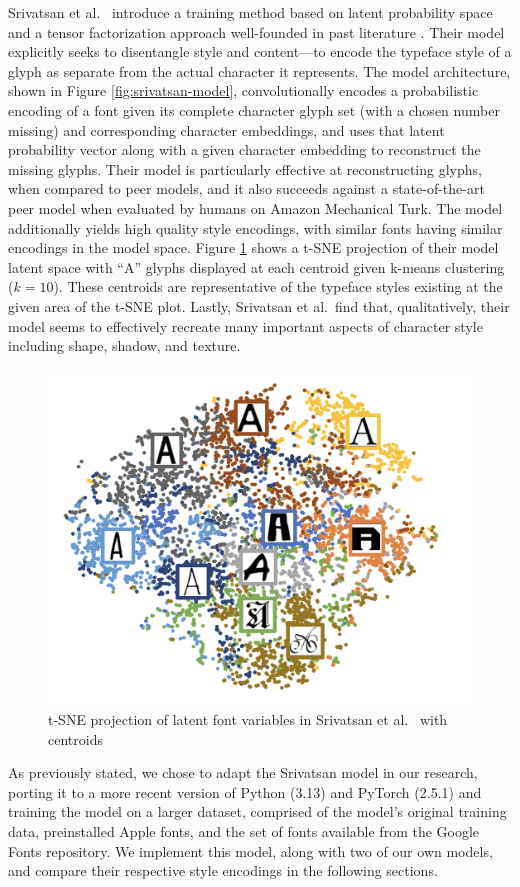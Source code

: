 Srivatsan et al.\ \cite{srivatsan2020} introduce a training method based on latent probability space and a tensor factorization approach well-founded in past literature \cite{freeman1997,tenenbaum2000,vasilescu2002,tang2013}. Their model explicitly seeks to disentangle style and content—to encode the typeface style of a glyph as separate from the actual character it represents. The model architecture, shown in Figure \ref{fig:srivatsan-model}, convolutionally encodes a probabilistic encoding of a font given its complete character glyph set (with a chosen number missing) and corresponding character embeddings, and uses that latent probability vector along with a given character embedding to reconstruct the missing glyphs. Their model is particularly effective at reconstructing glyphs, when compared to peer models, and it also succeeds against a state-of-the-art peer model \cite{azadi2017} when evaluated by humans on Amazon Mechanical Turk. The model additionally yields high quality style encodings, with similar fonts having similar encodings in the model space. Figure \ref{fig:srivatsan-latent} shows a t-SNE projection \cite{vandermaaten2008} of their model latent space with ``A'' glyphs displayed at each centroid given k-means clustering ($k=10$). These centroids are representative of the typeface styles existing at the given area of the t-SNE plot. Lastly, Srivatsan et al.\ find that, qualitatively, their model seems to effectively recreate many important aspects of character style including shape, shadow, and texture.

\begin{figure}[]
    \centering
    \includegraphics[width=.7\textwidth]{images/srivatsan-latent.png}
    \caption{t-SNE projection of latent font variables in Srivatsan et al.\ \cite{srivatsan2020} with centroids}
    \label{fig:srivatsan-latent}
\end{figure}

As previously stated, we chose to adapt the Srivatsan model in our research, porting it to a more recent version of Python (3.13) and PyTorch (2.5.1) and training the model on a larger dataset, comprised of the model's original training data, preinstalled Apple fonts, and the set of fonts available from the Google Fonts repository. We implement this model, along with two of our own models, and compare their respective style encodings in the following sections.